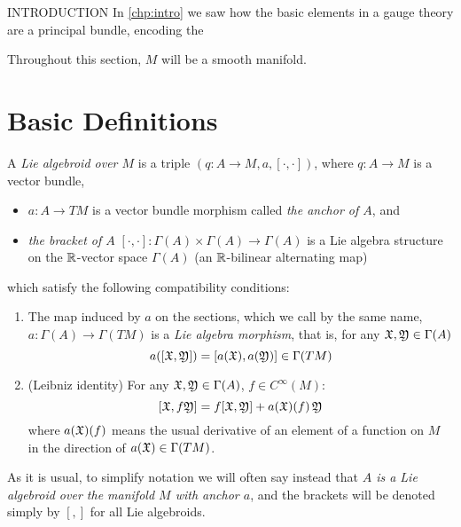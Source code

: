 INTRODUCTION  In \ref{chp:intro} we saw how the basic elements in a gauge theory are a principal bundle, encoding the 


Throughout this section, $M$ will be a smooth manifold.

\section{Basic Definitions}

\begin{definition} \label{defnLieAlgoid}
A \emph{Lie algebroid over $M$} is a triple $(q:A \to M, a, [\cdot, \cdot ])$, where $q:A \to M$ is a vector bundle, 
    \begin{itemize}
    \item $a:A \to TM$ is a vector bundle morphism called \emph{the anchor of $A$}, and
    \item \emph{the bracket of $A$} $[\cdot, \cdot ]: \Gamma(A) \times \Gamma(A) \to \Gamma(A)$ is a Lie algebra structure on the $\operatorname{\mathbb{R}}$-vector space $\Gamma(A)$ (an $\operatorname{\mathbb{R}}$-bilinear alternating map) 
    \end{itemize}  which satisfy the following compatibility conditions:

\begin{enumerate}
    \item The map induced by $a$ on the sections, which we call by the same name, $a:\Gamma(A) \to \Gamma(TM)$ is a \emph{Lie algebra morphism}, that is, for any $\mathfrak{X}, \mathfrak{Y} \in \Gamma(A)$ \[ a([\mathfrak{X}, \mathfrak{Y}])  = [a(\mathfrak{X}), a(\mathfrak{Y})] \in  \Gamma(TM)\]
    
    \item (Leibniz identity) For any $\mathfrak{X}, \mathfrak{Y} \in \Gamma(A)$, $f \in C^\infty (M)$: \[ [\mathfrak{X}, f\mathfrak{Y}] = f[\mathfrak{X}, \mathfrak{Y}] + a(\mathfrak{X})(f)\, \mathfrak{Y} \] where $a(\mathfrak{X})(f)$ means the usual derivative of an element of a function on $M$ in the direction of $a(\mathfrak{X}) \in \Gamma(TM)$.
\end{enumerate}
\end{definition}

As it is usual, to simplify notation we will often say instead that \emph{$A$ is a Lie algebroid over the manifold $M$ with anchor $a$}, and the brackets will be denoted simply by $[,]$ for all Lie algebroids.

